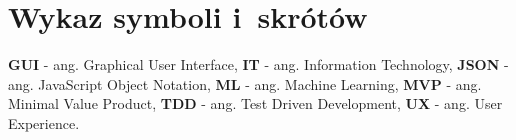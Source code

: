 \chapter*{Wykaz symboli i~skrótów}

\noindent
\textbf{GUI} - ang. Graphical User Interface, \newline
\textbf{IT} - ang. Information Technology, \newline
\textbf{JSON} - ang. JavaScript Object Notation, \newline
\textbf{ML} - ang. Machine Learning, \newline
\textbf{MVP} - ang. Minimal Value Product, \newline
\textbf{TDD} - ang. Test Driven Development, \newline
\textbf{UX} - ang. User Experience. \newline

\cleardoublepage